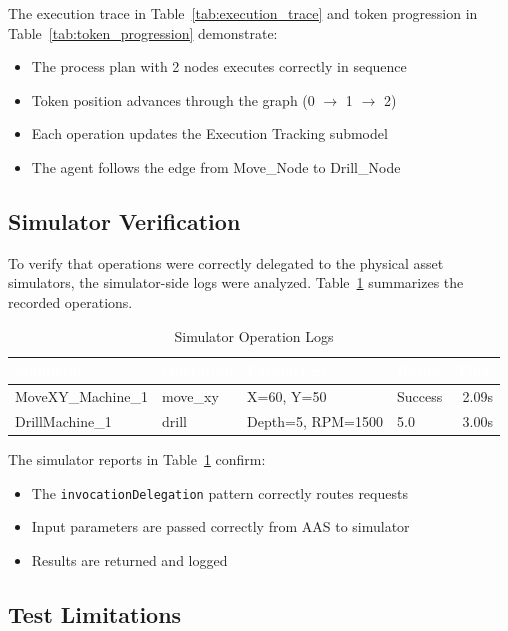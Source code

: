 The execution trace in Table~\ref{tab:execution_trace} and token progression in Table~\ref{tab:token_progression} demonstrate:
\begin{itemize}
    \item The process plan with 2 nodes executes correctly in sequence
    \item Token position advances through the graph (0 $\rightarrow$ 1 $\rightarrow$ 2)
    \item Each operation updates the Execution Tracking submodel
    \item The agent follows the edge from Move\_Node to Drill\_Node
\end{itemize}

\subsection{Simulator Verification}
\label{subsec:simulator_verification}

To verify that operations were correctly delegated to the physical asset simulators, the simulator-side logs were analyzed. Table~\ref{tab:simulator_logs} summarizes the recorded operations.

\begin{table}[ht]
\centering
\caption{Simulator Operation Logs}
\label{tab:simulator_logs}
\begin{tabular}{llllr}
\toprule
\rowcolor{headerblue}
\textcolor{white}{Simulator} & \textcolor{white}{Operation} & \textcolor{white}{Parameters} & \textcolor{white}{Result} & \textcolor{white}{Time} \\
\midrule
MoveXY\_Machine\_1 & move\_xy & X=60, Y=50 & Success & 2.09s \\
\rowcolor{lightgray}
DrillMachine\_1 & drill & Depth=5, RPM=1500 & 5.0 & 3.00s \\
\bottomrule
\end{tabular}
\end{table}

The simulator reports in Table~\ref{tab:simulator_logs} confirm:
\begin{itemize}
    \item The \texttt{invocationDelegation} pattern correctly routes requests
    \item Input parameters are passed correctly from \ac{AAS} to simulator
    \item Results are returned and logged
\end{itemize}

\subsection{Test Limitations}
\label{subsec:test_limitations}

